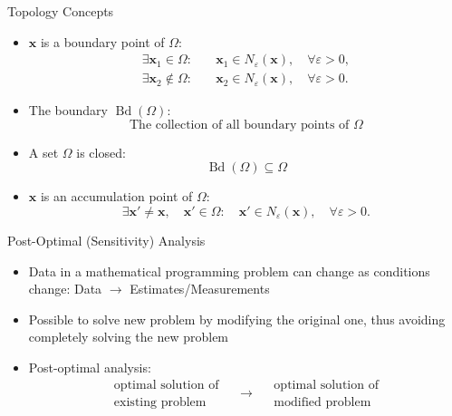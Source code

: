 \documentclass[aspectratio=169,hyperref,UTF8,CJK]{beamer}
\newcommand{\vect}[1]{\boldsymbol{#1}}
\begin{document}
\begin{frame}{Topology Concepts}
  \small
  \begin{itemize}
    \item $\vect{x}$ is a boundary point of $\Omega$:
      \begin{align*}
        \exists\vect{x}_1\in\Omega:&\quad\vect{x}_1\in N_{\varepsilon}(\vect{x}),\quad\forall\varepsilon>0,\\
        \exists\vect{x}_2\notin\Omega:&\quad\vect{x}_2\in N_{\varepsilon}(\vect{x}),\quad\forall\varepsilon>0.
      \end{align*}
    \item The boundary $\operatorname{Bd}(\Omega)$:
      \begin{equation*}
        \text{The collection of all boundary points of }\Omega
      \end{equation*}
    \item A set $\Omega$ is closed:
      \begin{equation*}
        \operatorname{Bd}(\Omega)\subseteq\Omega
      \end{equation*}
    \item $\vect{x}$ is an accumulation point of $\Omega$:
      \begin{equation*}
        \exists\vect{x}'\ne\vect{x},\quad \vect{x}'\in\Omega:\quad
        \vect{x}'\in N_{\varepsilon}(\vect{x}),\quad\forall\varepsilon>0.
      \end{equation*}
  \end{itemize}
\end{frame}

\begin{frame}{Post-Optimal (Sensitivity) Analysis}
  \begin{itemize}
    \item Data in a mathematical programming problem can change as conditions change: Data $\rightarrow$ Estimates/Measurements
    \item Possible to solve new problem by modifying the original one, thus avoiding completely solving the new problem
    \item Post-optimal analysis:
      \begin{equation*}
        \begin{array}{c}\text{optimal solution of}\\[-1mm]\text{existing problem}\end{array}
        \quad\longrightarrow\quad
        \begin{array}{c}\text{optimal solution of}\\[-1mm]\text{modified problem}\end{array}
      \end{equation*}
  \end{itemize}
\end{frame}
\end{document}
